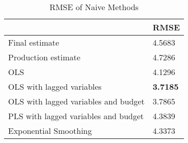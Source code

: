 \begin{table}[h!]
\centering
\caption{RMSE of Naive Methods}
\label{naive_rmse}
\begin{tabular}{ll}
\toprule
 & RMSE \\
\midrule
Final estimate & 4.5683 \\
Production estimate & 4.7286 \\
OLS & 4.1296 \\
OLS with lagged variables & \textbf{3.7185} \\
OLS with lagged variables and budget & 3.7865 \\
PLS with lagged variables and budget & 4.3839 \\
Exponential Smoothing & 4.3373 \\
\bottomrule
\end{tabular}
\end{table}
